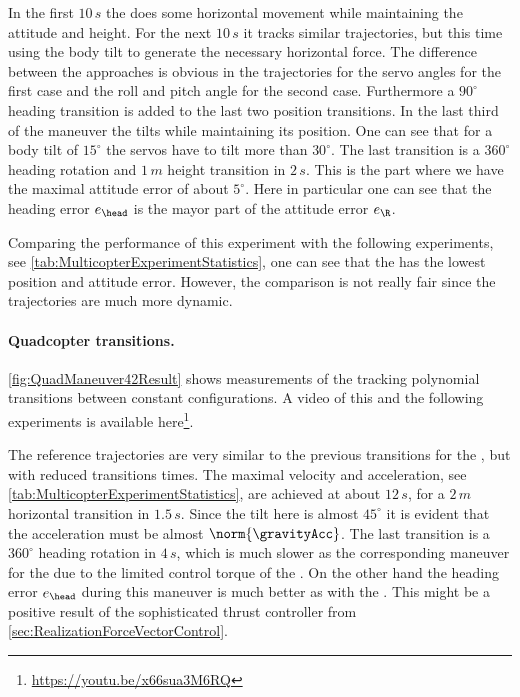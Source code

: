 In the first $10\,\unit{s}$ the \Tricopter does some horizontal movement while maintaining the attitude and height.
For the next $10\,\unit{s}$ it tracks similar trajectories, but this time using the body tilt to generate the necessary horizontal force.
The difference between the approaches is obvious in the trajectories for the servo angles for the first case and the roll and pitch angle for the second case.
Furthermore a $90^\circ$ heading transition is added to the last two position transitions.
In the last third of the maneuver the \Tricopter tilts while maintaining its position.
One can see that for a body tilt of $15^\circ$ the servos have to tilt more than $30^\circ$.
The last transition is a $360^\circ$ heading rotation and $1\,\unit{m}$ height transition in $2\,\unit{s}$.
This is the part where we have the maximal attitude error of about $5^\circ$.
Here in particular one can see that the heading error $e_{\head}$ is the mayor part of the attitude error $e_{\R}$.

Comparing the performance of this \Tricopter experiment with the following \Quadcopter experiments, see \autoref{tab:MulticopterExperimentStatistics}, one can see that the \Tricopter has the lowest position and attitude error.
However, the comparison is not really fair since the \Quadcopter trajectories are much more dynamic.

\paragraph{Quadcopter transitions.}
\autoref{fig:QuadManeuver42Result} shows measurements of the \Quadcopter tracking polynomial transitions between constant configurations.
A video of this and the following experiments is available here\footnote{\url{https://youtu.be/x66sua3M6RQ}}.

The reference trajectories are very similar to the previous transitions for the \Tricopter, but with reduced transitions times.
The maximal velocity and acceleration, see \autoref{tab:MulticopterExperimentStatistics}, are achieved at about $12\,\unit{s}$, for a $2\,\unit{m}$ horizontal transition in $1.5\,\unit{s}$.
Since the tilt here is almost $45^\circ$ it is evident that the acceleration must be almost $\norm{\gravityAcc}$.
The last transition is a $360^\circ$ heading rotation in $4\,\unit{s}$, which is much slower as the corresponding maneuver for the \Tricopter due to the limited control torque of the \Quadcopter.
On the other hand the heading error $e_{\head}$ during this maneuver is much better as with the \Tricopter.
This might be a positive result of the sophisticated thrust controller from \autoref{sec:RealizationForceVectorControl}.

